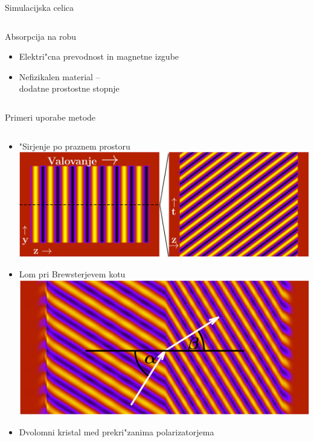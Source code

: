 \documentclass{beamer}
\begin{document}
\begin{frame}{Simulacijska celica}
\begin{columns}

 \begin{block}{Absorpcija na robu}
  \begin{itemize}
   \item Elektri"cna prevodnost in magnetne izgube
   \item Nefizikalen material -- \\ dodatne prostostne stopnje
  \end{itemize}
 \end{block}

\end{columns}
\end{frame}


\begin{frame}{Primeri uporabe metode}
\begin{columns}[c]

\begin{column}[T]{.46\textwidth}
\begin{itemize}
 \item "Sirjenje po praznem prostoru
 \includegraphics[width=.6\textwidth]{./Slike/empty}
 
 \item Lom pri Brewsterjevem kotu
 \includegraphics[width=.6\textwidth]{./Slike/refraction}
 
 
  \item Dvolomni kristal med prekri"zanima polarizatorjema\\
  \resizebox{.65\textwidth}{!}{}

\end{itemize}

\end{column}


\end{columns}
\end{frame}
\end{document}
